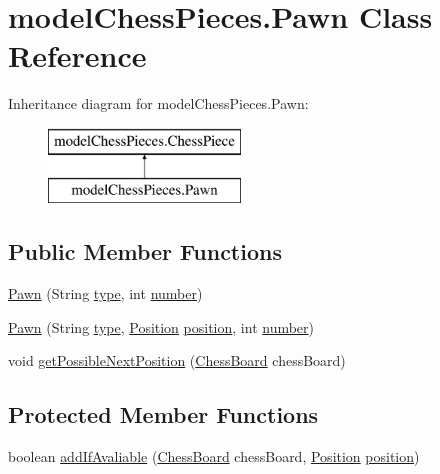 \hypertarget{classmodel_chess_pieces_1_1_pawn}{\section{model\+Chess\+Pieces.\+Pawn Class Reference}
\label{classmodel_chess_pieces_1_1_pawn}
}
Inheritance diagram for model\+Chess\+Pieces.\+Pawn\+:\begin{figure}[H]
\begin{center}
\leavevmode
\includegraphics[height=2.000000cm]{classmodel_chess_pieces_1_1_pawn}
\end{center}
\end{figure}
\subsection*{Public Member Functions}
\begin{DoxyCompactItemize}
\item 
\hyperlink{classmodel_chess_pieces_1_1_pawn_a7621de9604258a4ec1c58480b1655564}{Pawn} (String \hyperlink{classmodel_chess_pieces_1_1_chess_piece_a195487ca88c197af7c1604247be31db2}{type}, int \hyperlink{classmodel_chess_pieces_1_1_chess_piece_a979e63b99128333883acedc38d25dc87}{number})
\item 
\hyperlink{classmodel_chess_pieces_1_1_pawn_afcf3ca5e22f454c225ca2240af0f4519}{Pawn} (String \hyperlink{classmodel_chess_pieces_1_1_chess_piece_a195487ca88c197af7c1604247be31db2}{type}, \hyperlink{classmodel_core_1_1_position}{Position} \hyperlink{classmodel_chess_pieces_1_1_chess_piece_a3d4362d5b28f6edb14161196d9c6807d}{position}, int \hyperlink{classmodel_chess_pieces_1_1_chess_piece_a979e63b99128333883acedc38d25dc87}{number})
\item 
void \hyperlink{classmodel_chess_pieces_1_1_pawn_a309e120aa9f1884cb8b18b7e607eb586}{get\+Possible\+Next\+Position} (\hyperlink{classmodel_core_1_1_chess_board}{Chess\+Board} chess\+Board)
\end{DoxyCompactItemize}
\subsection*{Protected Member Functions}
\begin{DoxyCompactItemize}
\item 
boolean \hyperlink{classmodel_chess_pieces_1_1_pawn_adf484645070f9dd3a774ea779aa84260}{add\+If\+Avaliable} (\hyperlink{classmodel_core_1_1_chess_board}{Chess\+Board} chess\+Board, \hyperlink{classmodel_core_1_1_position}{Position} \hyperlink{classmodel_chess_pieces_1_1_chess_piece_a3d4362d5b28f6edb14161196d9c6807d}{position})
\end{DoxyCompactItemize}

